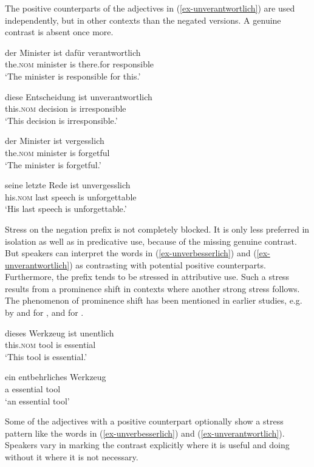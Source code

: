 \documentclass[output=paper
  ,nobabel
  ,draftmode
  ,colorlinks, citecolor=brown
]{langscibook}
\begin{document}
\noindent The positive counterparts of the adjectives in (\ref{ex-unverantwortlich}) are used independently, but in other contexts than the negated versions. A genuine contrast is absent once more.

\eal
\ex
\gll der              Minister ist dafür     verantwortlich \\
     the.\textsc{nom} minister is  there.for responsible \\
\glt `The minister is responsible for this.'

\ex
\gll diese Entscheidung ist unverantwortlich \\
	this.\textsc{nom} decision is irresponsible\\
\glt `This decision is irresponsible.'
\zl


\eal
\ex
\gll der Minister ist vergesslich \\
	the.\textsc{nom} minister is forgetful\\
\glt `The minister is forgetful.'

\ex
\gll seine letzte Rede ist unvergesslich \\
	his.\textsc{nom} last speech is unforgettable\\
\glt `His last speech is unforgettable.'
\zl

\noindent Stress on the negation prefix is not completely blocked. It is only less preferred in isolation as well as in predicative use, because of the missing genuine contrast. But speakers can interpret the words in (\ref{ex-unverbesserlich}) and (\ref{ex-unverantwortlich}) as contrasting with potential positive counterparts. Furthermore, the prefix tends to be stressed in attributive use. Such a stress results from a prominence shift in contexts where another strong stress follows. The phenomenon of prominence shift has been mentioned in earlier studies, e.g. by \citet{ChomskyHalle1968} and \citet{Selkirk1995} for , and \citet{Wiese1996} for .

\eal
\ex
\gll dieses Werkzeug ist unentlich \\
this.\textsc{nom} tool is essential \\
\glt `This tool is essential.'

\ex
\gll ein entbehrliches Werkzeug \\
	a essential tool\\
\glt `an essential tool'
\zl

\largerpage
\noindent 
Some of the adjectives with a positive counterpart optionally show a stress pattern like the words in (\ref{ex-unverbesserlich}) and (\ref{ex-unverantwortlich}). Speakers vary in marking the contrast explicitly where it is useful and doing without it where it is not necessary. 
\end{document}
